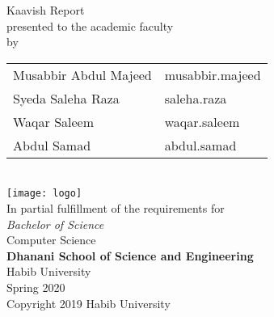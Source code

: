 \begin{titlepage}
  \begin{center}
    \textbf{\Huge \Title}
    \bigskip

    {\large Kaavish Report\\
      presented to the academic faculty\\
      by\\
      \begin{tabular}{ll}
        Musabbir Abdul Majeed & musabbir.majeed\\
        Syeda Saleha Raza & saleha.raza\\
        Waqar Saleem & waqar.saleem\\
        Abdul Samad & abdul.samad\\
      \end{tabular}
    }\\\vfill
    \texttt{[image: logo]}\\
    {\large In partial fulfillment of the requirements for\\
      \textit{Bachelor of Science}\\
      Computer Science\\\medskip
      \textbf{Dhanani School of Science and Engineering}\\\medskip
      Habib University\\\smallskip
      Spring 2020
    }\\\vfill
    Copyright {\scriptsize \textcopyright} 2019 Habib University
  \end{center}
\end{titlepage}

